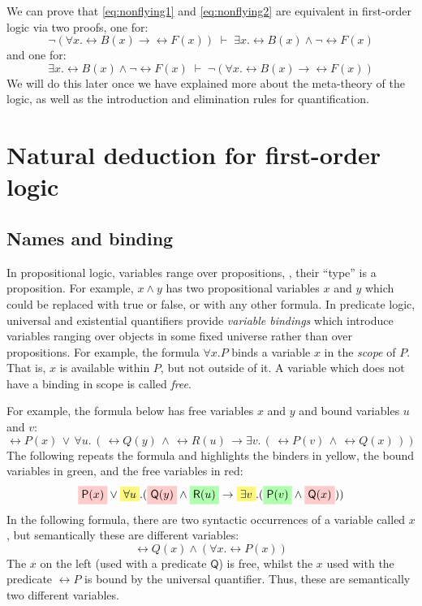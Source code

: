 We can prove that \eqref{eq:nonflying1} and
\eqref{eq:nonflying2} are equivalent in first-order logic via two
proofs, one for:
$$\neg (\forall x . \rel{B}(x) \rightarrow \rel{F}(x)) \; \vdash \;
\exists x . \rel{B}(x) \wedge \neg \rel{F}(x)$$
and one for:
$$
\exists x . \rel{B}(x) \wedge \neg \rel{F}(x) \; \vdash \;
\neg (\forall x . \rel{B}(x) \rightarrow \rel{F}(x))
$$
We will do this later once we have explained more about the
meta-theory of the logic, as well as the introduction and elimination
rules for quantification.

\section{Natural deduction for first-order logic}

\subsection{Names and binding}

In propositional logic, variables range over propositions, \ie{},
their ``type'' is a proposition. For example, $x \wedge y$ has two
propositional variables $x$ and $y$ which could be replaced with true
or false, or with any other formula. In predicate logic, universal and
existential quantifiers provide \emph{variable bindings} which
introduce variables ranging over objects in some fixed universe rather than
over propositions. For example, the formula $\forall x . P$ binds
a variable $x$ in the \emph{scope} of $P$. That is, $x$
is available within $P$, but not outside of it. A variable which does
not have a binding in scope is called \emph{free}.

For example, the formula below has free variables $x$ and $y$
and bound variables $u$ and $v$:
%
\begin{equation*}
\rel{P}(x) \, \vee  \, \forall u . \, (\, \rel{Q}(y) \, \wedge \,
\rel{R}(u) \, \rightarrow \exists v . \, (\, \rel{P}(v) \, \wedge \, \rel{Q}(x) \,))
\end{equation*}
%
The following repeats the formula and
highlights the binders in yellow, the bound variables
in green, and the free variables in red:
%
\begin{equation*}
\highlightR{\rel{P}(x)} \vee \highlight{\forall u} . (\highlightR{\rel{Q}(y)} \wedge \highlightG{\rel{R}(u)}
\rightarrow \highlight{\exists v} .
(\highlightG{\rel{P}(v)} \wedge \highlightR{\rel{Q}(x)}))
\end{equation*}
%
%
In the following formula, there are two syntactic occurrences of a
variable called $x$, but semantically these are different variables:
%
\begin{equation*}
\rel{Q}(x) \wedge (\forall x . \rel{P}(x))
\end{equation*}
%
The $x$ on the left (used with a predicate $\mathsf{Q}$) is free,
whilst the $x$ used with the predicate $\rel{P}$ is bound by the
universal quantifier. Thus, these are semantically two different
variables.

